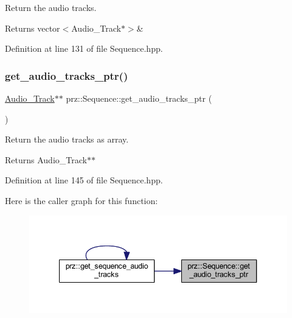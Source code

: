 Return the audio tracks. 

\begin{DoxyReturn}{Returns}
vector$<$\+Audio\+\_\+\+Track$\ast$$>$\& 
\end{DoxyReturn}


Definition at line 131 of file Sequence.\+hpp.

\mbox{\label{classprz_1_1_sequence_a3e0efc91f696efcc1d57de2045fc4d21}} 
\subsubsection{\texorpdfstring{get\_audio\_tracks\_ptr()}{get\_audio\_tracks\_ptr()}}
{\footnotesize\ttfamily \mbox{\hyperlink{classprz_1_1_audio___track}{Audio\+\_\+\+Track}}$\ast$$\ast$ prz\+::\+Sequence\+::get\+\_\+audio\+\_\+tracks\+\_\+ptr (\begin{DoxyParamCaption}{ }\end{DoxyParamCaption})\hspace{0.3cm}{\ttfamily [inline]}}



Return the audio tracks as array. 

\begin{DoxyReturn}{Returns}
Audio\+\_\+\+Track$\ast$$\ast$ 
\end{DoxyReturn}


Definition at line 145 of file Sequence.\+hpp.

Here is the caller graph for this function\+:
\nopagebreak
\begin{figure}[H]
\begin{center}
\leavevmode
\includegraphics[width=340pt]{classprz_1_1_sequence_a3e0efc91f696efcc1d57de2045fc4d21_icgraph}
\end{center}
\end{figure}
\mbox{\label{classprz_1_1_sequence_a3482d0948898b7573df2e0f86d7e3a83}} 
